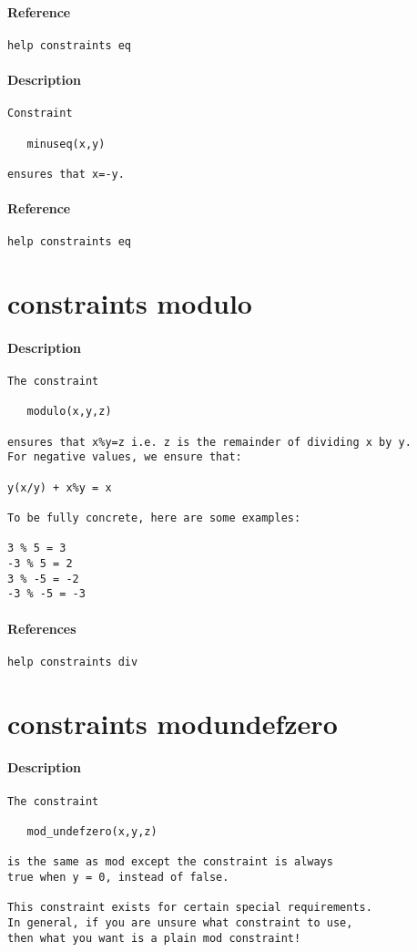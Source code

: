 \paragraph{Reference}
{\footnotesize
\begin{verbatim}
help constraints eq
\end{verbatim}
}
\paragraph{Description}
{\footnotesize
\begin{verbatim}
Constraint

   minuseq(x,y)

ensures that x=-y.
\end{verbatim}
}
\paragraph{Reference}
{\footnotesize
\begin{verbatim}
help constraints eq
\end{verbatim}
}
\section{constraints modulo}
\paragraph{Description}
{\footnotesize
\begin{verbatim}
The constraint

   modulo(x,y,z)

ensures that x%y=z i.e. z is the remainder of dividing x by y.
For negative values, we ensure that:

y(x/y) + x%y = x

To be fully concrete, here are some examples:

3 % 5 = 3
-3 % 5 = 2
3 % -5 = -2
-3 % -5 = -3
\end{verbatim}
}
\paragraph{References}
{\footnotesize
\begin{verbatim}
help constraints div
\end{verbatim}
}
\section{constraints mod\textunderscore undefzero}
\paragraph{Description}
{\footnotesize
\begin{verbatim}
The constraint

   mod_undefzero(x,y,z)

is the same as mod except the constraint is always
true when y = 0, instead of false.

This constraint exists for certain special requirements.
In general, if you are unsure what constraint to use,
then what you want is a plain mod constraint!
\end{verbatim}
}
